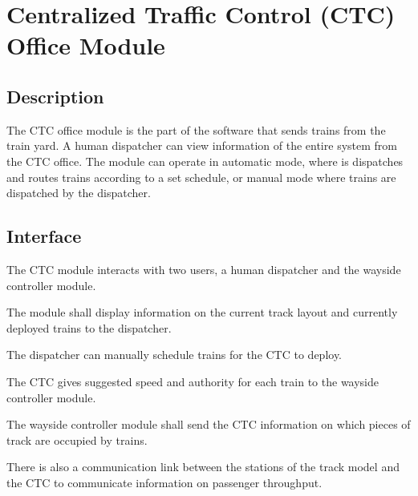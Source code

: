 \documentclass{scrreprt}
\begin{document}
\section{Centralized Traffic Control (CTC) Office Module}

\subsection{Description}
The CTC office module is the part of the software that sends trains from the
train yard. A human dispatcher can view information of the entire system
from the CTC office. The module can operate in automatic mode, where is dispatches
and routes trains according to a set schedule, or manual mode where trains are
dispatched by the dispatcher.

\subsection{Interface}
The CTC module interacts with two users, a human dispatcher and the wayside controller
module.
\begin{numonly}
    \item The module shall display information on the current track layout and currently
    deployed trains to the dispatcher.
    \item The dispatcher can manually schedule trains for the CTC to deploy.
\end{numonly}
\begin{numonly}
    \item The CTC gives suggested speed and authority for each train to the wayside
    controller module.
    \item The wayside controller module shall send the CTC information on which pieces of
    track are occupied by trains.
\end{numonly}
There is also a communication link between the stations of the track model and the
CTC to communicate information on passenger throughput.
\end{document}
